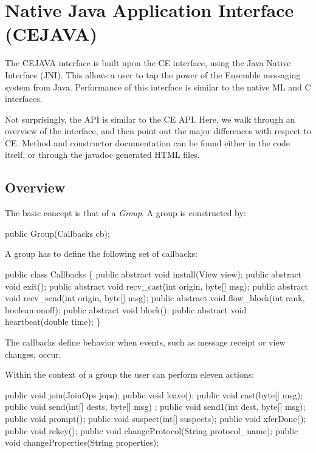 \section{Native Java Application Interface (CEJAVA)}

The CEJAVA interface is built upon the CE interface, using the Java
Native Interface (JNI). This allows a user to tap the power of the
Ensemble messaging system from Java. Performance of this interface is
similar to the native ML and C interfaces. 

Not surprisingly, the API is similar to the CE API. Here, we walk
through an overview of the interface, and then point out the major
differences with respect to CE. Method and constructor documentation
can be found either in the code itself, or through the javadoc
generated HTML files.

\subsection{Overview}
The basic concept is that of a {\it Group}. A group is constructed by: 
\begin{codebox}
    public Group(Callbacks cb);
\end{codebox}

A group has to define the following set of callbacks: 

\begin{codebox}
public class Callbacks \{
    public abstract void install(View view);
    public abstract void exit();
    public abstract void recv_cast(int origin, byte[] msg);
    public abstract void recv_send(int origin, byte[] msg);
    public abstract void flow_block(int rank, boolean onoff);
    public abstract void block();
    public abstract void heartbeat(double time);
\}
\end{codebox}

The callbacks define behavior when events, such as message receipt or
view changes, occur. 

Within the context of a group the user can perform eleven actions: 

\begin{codebox}
    public void join(JoinOps jops);
    public void leave();
    public void cast(byte[] msg);
    public void send(int[] dests, byte[] msg) ;
    public void send1(int dest, byte[] msg);
    public void prompt();
    public void suspect(int[] suspects);
    public void xferDone();
    public void rekey();
    public void changeProtocol(String protocol_name);
    public void changeProperties(String properties);
\end{codebox}

